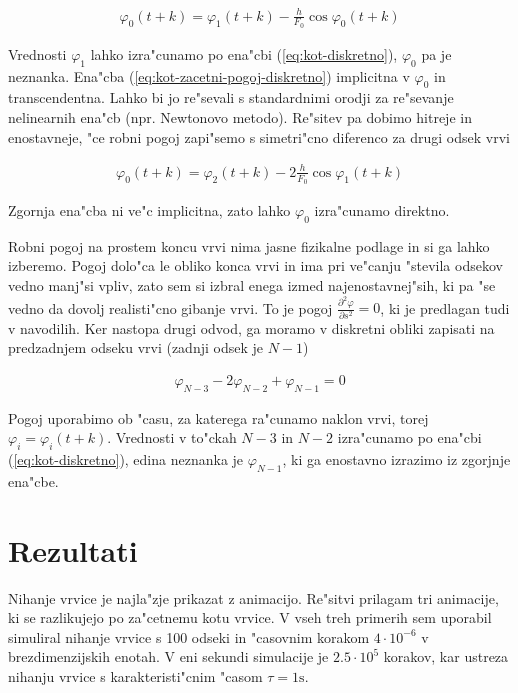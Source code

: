 \documentclass[a4paper,10pt]{article}
\renewcommand{\phi}{\varphi}
\newcommand{\parcdva}[2]{
  \frac{\partial^2 #1}{\partial #2 ^2}
}
\begin{document}
\begin{align}
 \label{eq:kot-zacetni-pogoj-diskretno}
 \phi_0(t+k) = \phi_1(t+k) - \frac{h}{F_0} \cos \phi_0(t+k)
\end{align}

Vrednosti $\phi_1$ lahko izra"cunamo po ena"cbi (\ref{eq:kot-diskretno}), $\phi_0$ pa je neznanka. Ena"cba (\ref{eq:kot-zacetni-pogoj-diskretno}) implicitna v $\phi_0$ in transcendentna. Lahko bi jo re"sevali s standardnimi orodji za re"sevanje nelinearnih ena"cb (npr. Newtonovo metodo). Re"sitev pa dobimo hitreje in enostavneje, "ce robni pogoj zapi"semo s simetri"cno diferenco za drugi odsek vrvi 

\begin{align}
 \label{eq:kot-zacetni-pogoj-diskretno-enostavno}
 \phi_0(t+k) = \phi_2(t+k) - 2\frac{h}{F_0} \cos \phi_1(t+k)
\end{align}

Zgornja ena"cba ni ve"c implicitna, zato lahko $\phi_0$ izra"cunamo direktno. 

Robni pogoj na prostem koncu vrvi nima jasne fizikalne podlage in si ga lahko izberemo. Pogoj dolo"ca le obliko konca vrvi in ima pri ve"canju "stevila odsekov vedno manj"si vpliv, zato sem si izbral enega izmed najenostavnej"sih, ki pa "se vedno da dovolj realisti"cno gibanje vrvi. To je pogoj $\parcdva{\phi}{s}=0$, ki je predlagan tudi v navodilih. Ker nastopa drugi odvod, ga moramo v diskretni obliki zapisati na predzadnjem odseku vrvi (zadnji odsek je $N-1$)

\begin{align}
 \phi_{N-3} -2\phi_{N-2} + \phi_{N-1} = 0
\end{align}

Pogoj uporabimo ob "casu, za katerega ra"cunamo naklon vrvi, torej $\phi_i = \phi_i(t+k)$. Vrednosti v to"ckah $N-3$ in $N-2$ izra"cunamo po ena"cbi (\ref{eq:kot-diskretno}), edina neznanka je $\phi_{N-1}$, ki ga enostavno izrazimo iz zgorjnje ena"cbe. 

\section{Rezultati}

Nihanje vrvice je najla"zje prikazat z animacijo. Re"sitvi prilagam tri animacije, ki se razlikujejo po za"cetnemu kotu vrvice. V vseh treh primerih sem uporabil simuliral nihanje vrvice s 100 odseki in "casovnim korakom $4 \cdot 10^{-6}$ v brezdimenzijskih enotah. V eni sekundi simulacije je $2.5 \cdot 10^5$ korakov, kar ustreza nihanju vrvice s karakteristi"cnim "casom $\tau = 1\mathrm{s}$. 
\end{document}
